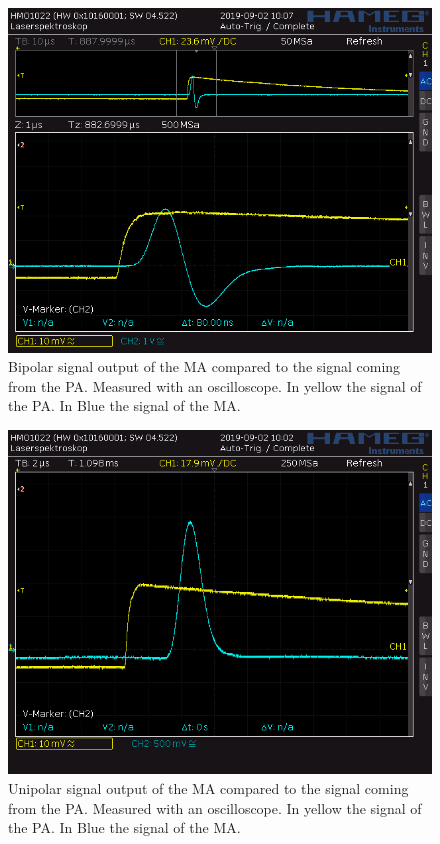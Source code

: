 \documentclass[30pt,a4paper]{article}
\begin{document}
	\begin{figure}
		\includegraphics[scale=0.42]{Bilder/OsziBipolar}
		\centering
		\caption[Bipolar Signal]{Bipolar signal output of the MA compared to the signal coming from the PA. Measured with an oscilloscope. In yellow the signal of the PA. In Blue the signal of the MA.}
		\label{Bi}
	\end{figure}
	\begin{figure}
		\includegraphics[scale=0.42]{Bilder/OsziUnipolar}
		\centering
		\caption[Unipolar Signal]{Unipolar signal output of the MA compared to the signal coming from the PA. Measured with an oscilloscope. In yellow the signal of the PA. In Blue the signal of the MA.}
		\label{Uni}
	\end{figure}
\end{document}

